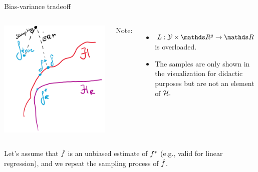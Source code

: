 \documentclass[11pt,compress,t,notes=noshow, xcolor=table]{beamer}
\begin{document}
\begin{vbframe}{Bias-variance tradeoff}
\begin{columns}[onlytextwidth,T]
  \includegraphics[width=1.0\textwidth]{slides/regularization/figure_man/to_replace_sampling.png}

      \lz
      Note: \\
      \begin{itemize}
          \item $L:\Yspace\times\R^g\rightarrow\R$ is overloaded.
          \item The samples are only shown in the visualization for didactic purposes but are not an element of $\mathcal{H}.$
      \end{itemize}
    \end{columns}

\framebreak

Let's assume that $\hat{f}$ is an unbiased estimate of $f^{\ast}$ (e.g., valid for linear regression), and we repeat the sampling process of $\hat{f}$.

\begin{columns}[onlytextwidth,T]


\end{columns}
\end{vbframe}
\end{document}

